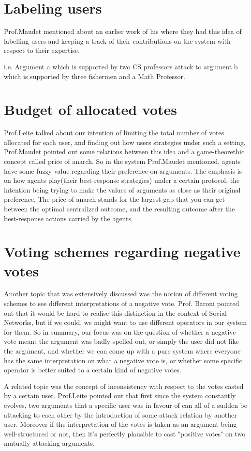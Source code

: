 \documentclass{article}
\begin{document}
\section{Labeling users}
Prof.Maudet mentioned about an earlier work of his where they had this idea of labelling users and keeping a track of their contributions on the system with respect to their expertise.

i.e. Argument a which is supported by two CS professors attack to argument b which is supported by three fishermen and a Math Professor.


\section{Budget of allocated votes}
Prof.Leite talked about our intention of limiting the total number of votes allocated for each user, and finding out how users strategies under such a setting. Prof.Maudet pointed out some relations between this idea and a game-theorethic concept called price of anarch. So in the system Prof.Maudet mentioned, agents have some fuzzy value regarding their preference on arguments. The emphasis is on how agents play(their best-response strategies) under a certain protocol, the intention being trying to make the values of arguments as close as their original preference. The price of anarch stands for the largest gap that you can get between the optimal centralized outcome, and the resulting outcome after the best-response actions carried by the agents. 


\section{Voting schemes regarding negative votes}
Another topic that was extensively discussed was the notion of different voting schemes to see different interpretations of a negative vote. Prof. Baroni pointed out that it would be hard to realise this distinction in the context of Social Networks, but if we could, we might want to use different operators in our system for them. So in summary, our focus was on the question of whether a negative vote meant the argument was badly spelled out, or simply the user did not like the argument, and whether we can come up with a pure system where everyone has the same interpretation on what a negative vote is, or whether some specific operator is better suited to a certain kind of negative votes.

A related topic was the concept of inconsistency with respect to the votes casted by a certain user. Prof.Leite pointed out that first since the system constantly evolves, two arguments that a specific user was in favour of can all of a sudden be attacking to each other by the introduction of some attack relation by another user. Moreover if the interpretation of the votes is taken as an argument being well-structured or not, then it's perfectly plausible to cast "positive votes" on two mutually attacking arguments.
\end{document}
